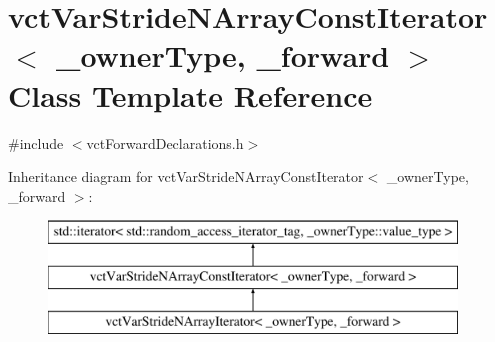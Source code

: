 \hypertarget{classvct_var_stride_n_array_const_iterator}{}\section{vct\+Var\+Stride\+N\+Array\+Const\+Iterator$<$ \+\_\+owner\+Type, \+\_\+forward $>$ Class Template Reference}
\label{classvct_var_stride_n_array_const_iterator}


{\ttfamily \#include $<$vct\+Forward\+Declarations.\+h$>$}

Inheritance diagram for vct\+Var\+Stride\+N\+Array\+Const\+Iterator$<$ \+\_\+owner\+Type, \+\_\+forward $>$\+:\begin{figure}[H]
\begin{center}
\leavevmode
\includegraphics[height=3.000000cm]{dc/daf/classvct_var_stride_n_array_const_iterator}
\end{center}
\end{figure}
